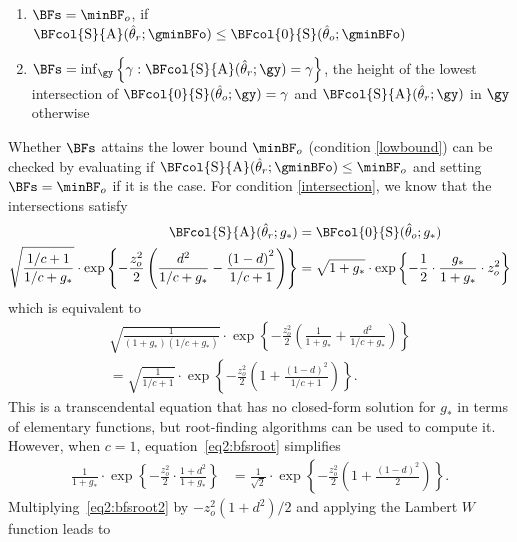 \begin{subappendices}
\begin{enumerate}
  \item \label{lowbound} $\BFs = \minBF_{o}$, if
  $\BFcol{\text{S}}{\text{A}}(\hat{\theta}_r; \gminBFo) \leq
  \BFcol{0}{\text{S}}(\hat{\theta}_o; \gminBFo)$

  \item \label{intersection}
  $\BFs = \inf_{\gy}
  \left\{\gamma : \BFcol{\text{S}}{\text{A}}(\hat{\theta}_r; \gy)
  = \gamma\right\}$,
  the height of the lowest intersection of
  $\BFcol{0}{\text{S}}(\hat{\theta}_o; \gy) = \gamma$ and
  $\BFcol{\text{S}}{\text{A}}(\hat{\theta}_r; \gy)$
  in $\gy$ otherwise
\end{enumerate}
Whether $\BFs$ attains the lower bound $\minBF_{o}$ (condition \ref{lowbound})
can be checked by evaluating if
$\BFcol{\text{S}}{\text{A}}(\hat{\theta}_r; \gminBFo) \leq \minBF_{o}$ and setting
$\BFs = \minBF_{o}$ if it is the case. For condition \ref{intersection}, we know
that the intersections satisfy
\begin{align*}
  \BFcol{\text{S}}{\text{A}}(\hat{\theta}_r; g_*) &=
  \BFcol{0}{\text{S}}(\hat{\theta}_o; g_*) \\
  \sqrt{\frac{1/c + 1}{1/c + g_*}} \cdot
  \exp\left\{-\frac{z_{o}^{2}}{2}\left(\frac{d^2}{1/c + g_*} -
  \frac{\left(1 - d\right)^2}{1/c + 1} \right)\right\}
  &= \sqrt{1 + g_*} \cdot
  \exp\left\{-\frac{1}{2} \cdot \frac{g_*}{1 + g_*} \cdot z^2_o\right\}
\end{align*}
which is equivalent to
\begin{align}
  \sqrt{\frac{1}{(1 + g_*)(1/c + g_*)}}\cdot\exp\left\{-\frac{z_{o}^{2}}{2}\left(
  \frac{1}{1 + g_*} + \frac{d^{2}}{1/c + g_*}\right)\right\} \nonumber \\
  = \sqrt{\frac{1}{1/c + 1}}\cdot\exp\left\{-\frac{z_{o}^{2}}{2}\left(
  1 + \frac{(1 - d)^{2}}{1/c + 1}\right)\right\}.
  \label{eq2:bfsroot}
\end{align}
This is a transcendental equation that has no closed-form solution for $g_*$ in
terms of elementary functions, but root-finding algorithms can be used to
compute it. However, when $c = 1$, equation~\eqref{eq2:bfsroot} simplifies
\begin{align}
  \label{eq2:bfsroot2}
  \frac{1}{1 + g_*}\cdot\exp\left\{-\frac{z_{o}^{2}}{2} \cdot
  \frac{1 + d^{2}}{1 + g_*}\right\}
  &= \frac{1}{\sqrt{2}}\cdot\exp\left\{-\frac{z_{o}^{2}}{2}\left(
  1 + \frac{(1 - d)^{2}}{2}\right)\right\}.
\end{align}
Multiplying~\eqref{eq2:bfsroot2} by $-z_{o}^{2}(1 + d^{2})/2$ and applying the
Lambert $W$ function leads to

\end{subappendices}
